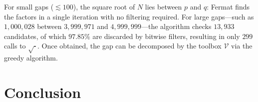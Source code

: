 \documentclass{sbc2023-pdf}%
\theoremstyle{plain}
\begin{document}
\begin{table}[htbp]
\centering
\caption{Semiprime gaps found by bitwise Fermat.}
\label{tab:semiprime_gap}
\end{table}

For small gaps (\(\lesssim 100\)), the square root of \(N\) lies between \(p\) and \(q\): Fermat finds the factors in a single iteration with no filtering required. For large gaps---such as \(1,000,028\) between \(3,999,971\) and \(4,999,999\)---the algorithm checks \(13,933\) candidates, of which \(97.85\%\) are discarded by bitwise filters, resulting in only \(299\) calls to \(\sqrt{\cdot}\). Once obtained, the gap can be decomposed by the toolbox \(\mathcal{V}\) via the greedy algorithm.

\section{Conclusion}
\end{document}
